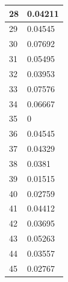 \begin{tabular}{|l||l|}
	28 & 0.04211 \\ \hline
	29 & 0.04545 \\ \hline
	30 & 0.07692 \\ \hline
	31 & 0.05495 \\ \hline
	32 & 0.03953 \\ \hline
	33 & 0.07576 \\ \hline
	34 & 0.06667 \\ \hline
	35 & 0 \\ \hline
	36 & 0.04545 \\ \hline
	37 & 0.04329 \\ \hline
	38 & 0.0381 \\ \hline
	39 & 0.01515 \\ \hline
	40 & 0.02759 \\ \hline
	41 & 0.04412 \\ \hline
	42 & 0.03695 \\ \hline
	43 & 0.05263 \\ \hline
	44 & 0.03557 \\ \hline
	45 & 0.02767 \\ \hline
\end{tabular}
